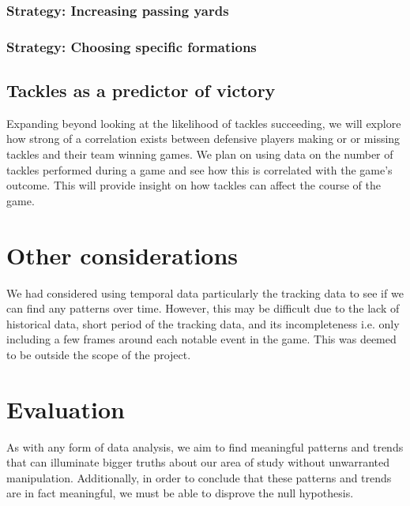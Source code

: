 \documentclass[bibtex, sigconf, hyperref={colorlinks=true,linkcolor=blue,urlcolor=blue}]{acmart}
\begin{document}

\subsubsection{Strategy: Increasing passing yards}


\subsubsection{Strategy: Choosing specific formations}


\subsection{Tackles as a predictor of victory}


Expanding beyond looking at the likelihood of tackles succeeding, we will
explore how strong of a correlation exists between defensive players making or
or missing tackles and their team winning games.  We plan on using data on the
number of tackles performed during a game and see how this is correlated with
the game's outcome.  This will provide insight on how tackles can affect the
course of the game.

\section{Other considerations}

We had considered using temporal data particularly the tracking data to see if
we can find any patterns over time. However, this may be difficult due to the
lack of historical data, short period of the tracking data, and its
incompleteness i.e. only including a few frames around each notable event in the
game. This was deemed to be outside the scope of the project.

\section{Evaluation}

As with any form of data analysis, we aim to find meaningful patterns and trends
that can illuminate bigger truths about our area of study without unwarranted
manipulation. Additionally, in order to conclude that these patterns and trends
are in fact meaningful, we must be able to disprove the null hypothesis.
\end{document}

